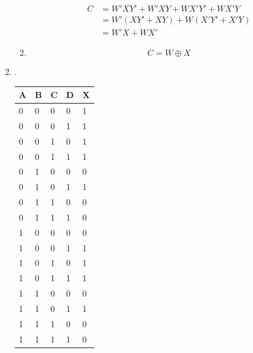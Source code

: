 \documentclass[10pt]{article}
\begin{document}
\begin{enumerate}
\begin{enumerate}
\begin{align*}
        C&=W'XY'+W'XY+WX'Y'+WX'Y \\
         &=W'(XY'+XY)+W(X'Y'+X'Y) \\
         &=W'X+WX'
      \end{align*}
    \item 
      \begin{equation*}
        C=W\oplus X
      \end{equation*}
  \end{enumerate}
\item . \\
    \begin{tabular}{|l|l|l|l||l|}
      \hline
      \textbf{A}	 & 	\textbf{B}	 & 	\textbf{C}	 & 	\textbf{D}	 & 	\textbf{X} \\ \hline
      0	 & 	0	 & 	0	 & 	0	 & 	1 \\ \hline
      0	 & 	0	 & 	0	 & 	1	 & 	1 \\ \hline
      0	 & 	0	 & 	1	 & 	0	 & 	1 \\ \hline
      0	 & 	0	 & 	1	 & 	1	 & 	1 \\ \hline
      0	 & 	1	 & 	0	 & 	0	 & 	0 \\ \hline
      0	 & 	1	 & 	0	 & 	1	 & 	1 \\ \hline
      0	 & 	1	 & 	1	 & 	0	 & 	0 \\ \hline
      0	 & 	1	 & 	1	 & 	1	 & 	0 \\ \hline
      1	 & 	0	 & 	0	 & 	0	 & 	0 \\ \hline
      1	 & 	0	 & 	0	 & 	1	 & 	1 \\ \hline
      1	 & 	0	 & 	1	 & 	0	 & 	1 \\ \hline
      1	 & 	0	 & 	1	 & 	1	 & 	1 \\ \hline
      1	 & 	1	 & 	0	 & 	0	 & 	0 \\ \hline
      1	 & 	1	 & 	0	 & 	1	 & 	1 \\ \hline
      1	 & 	1	 & 	1	 & 	0	 & 	0 \\ \hline
      1	 & 	1	 & 	1	 & 	1	 & 	0 \\ \hline
      \end{tabular}

\end{enumerate}
\end{document}
